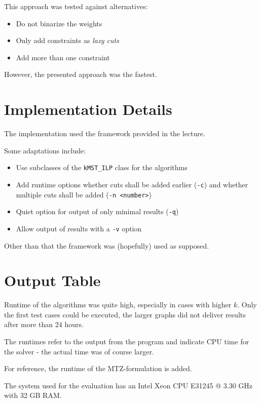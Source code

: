 \documentclass[11pt, oneside, a4paper, fleqn]{article}
\begin{document}
This approach was tested against alternatives:
\begin{itemize}
\item Do not binarize the weights
\item Only add constraints as \emph{lazy cuts}
\item Add more than one constraint
\end{itemize}

However, the presented approach was the fastest.

\section*{Implementation Details}

The implementation used the framework provided in the lecture.

Some adaptations include:
\begin{itemize}
\item Use subclasses of the \texttt{kMST\_ILP} class
      for the algorithms
\item Add runtime options whether cuts shall be added
      earlier (\texttt{-c}) and whether multiple cuts
      shall be added (\texttt{-n <number>})
\item Quiet option for output of only minimal results (\texttt{-q})
\item Allow output of results with a \texttt{-v} option
\end{itemize}

Other than that the framework was (hopefully) used as supposed.

\section*{Output Table}

Runtime of the algorithms was quite high, especially in
cases with higher $k$.
Only the first test cases could be executed, the larger
graphs did not deliver results after more than 24 hours.

The runtimes refer to the output from the program and indicate
CPU time for the solver - the actual time was of course larger.

For reference, the runtime of the MTZ-formulation is added.

The system used for the evaluation has an Intel\textregistered{}
Xeon\textregistered{} CPU E31245 @ 3.30 GHz with 32 GB RAM.
\end{document}
